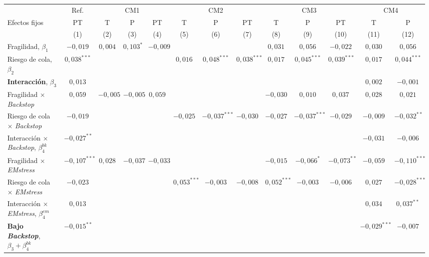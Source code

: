 \begingroup\setlength{\tabcolsep}{3pt}\renewcommand{\arraystretch}{1.3}%
\begin{adjustbox}{max width=0.97\textwidth}
\begin{tabular}{l c ccc ccc ccc cc}
\toprule
 & Ref. & \multicolumn{3}{c}{CM1} & \multicolumn{3}{c}{CM2} & \multicolumn{3}{c}{CM3} & \multicolumn{2}{c}{CM4} \\
\cmidrule(lr){2-2}\cmidrule(lr){3-5}\cmidrule(lr){6-8}\cmidrule(lr){9-11}\cmidrule(lr){12-13}
Efectos fijos & PT & T & P & PT & T & P & PT & T & P & PT & T & P \\
 & (1) & (2) & (3) & (4) & (5) & (6) & (7) & (8) & (9) & (10) & (11) & (12) \\
\midrule
Fragilidad, $\beta_1$ & $-0{,}019$ & $0{,}004$ & $0{,}103^{*}$ & $-0{,}009$ &  &  &  & $0{,}031$ & $0{,}056$ & $-0{,}022$ & $0{,}030$ & $0{,}056$ \\
Riesgo de cola, $\beta_2$ & $0{,}038^{***}$ &  &  &  & $0{,}016$ & $0{,}048^{***}$ & $0{,}038^{***}$ & $0{,}017$ & $0{,}045^{***}$ & $0{,}039^{***}$ & $0{,}017$ & $0{,}044^{***}$ \\
\textbf{Interacción}, $\beta_3$ & $0{,}013$ &  &  &  &  &  &  &  &  &  & $0{,}002$ & $-0{,}001$ \\
Fragilidad $\times$ \textit{Backstop} & $0{,}059$ & $-0{,}005$ & $-0{,}005$ & $0{,}059$ &  &  &  & $-0{,}030$ & $0{,}010$ & $0{,}037$ & $0{,}028$ & $0{,}021$ \\
Riesgo de cola $\times$ \textit{Backstop} & $-0{,}019$ &  &  &  & $-0{,}025$ & $-0{,}037^{***}$ & $-0{,}030$ & $-0{,}027$ & $-0{,}037^{***}$ & $-0{,}029$ & $-0{,}009$ & $-0{,}032^{**}$ \\
Interacción $\times$ \textit{Backstop}, $\beta_4^{bk}$ & $-0{,}027^{**}$ &  &  &  &  &  &  &  &  &  & $-0{,}031$ & $-0{,}006$ \\
Fragilidad $\times$ \textit{EMstress} & $-0{,}107^{***}$ & $0{,}028$ & $-0{,}037$ & $-0{,}033$ &  &  &  & $-0{,}015$ & $-0{,}066^{*}$ & $-0{,}073^{**}$ & $-0{,}059$ & $-0{,}110^{***}$ \\
Riesgo de cola $\times$ \textit{EMstress} & $-0{,}023$ &  &  &  & $0{,}053^{***}$ & $-0{,}003$ & $-0{,}008$ & $0{,}052^{***}$ & $-0{,}003$ & $-0{,}006$ & $0{,}027$ & $-0{,}028^{***}$ \\
Interacción $\times$ \textit{EMstress}, $\beta_4^{em}$ & $0{,}013$ &  &  &  &  &  &  &  &  &  & $0{,}034$ & $0{,}037^{**}$ \\
\textbf{Bajo \textit{Backstop}}, $\beta_3+\beta_4^{bk}$ & $-0{,}015^{**}$ &  &  &  &  &  &  &  &  &  & $-0{,}029^{***}$ & $-0{,}007$ \\

\end{tabular}
\end{adjustbox}
